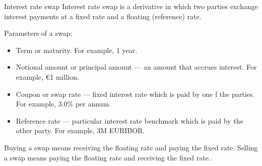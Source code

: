\documentclass{beamer}
\renewcommand{\EUR}[1]{\textup{\euro}#1}
\begin{document}
\begin{frame}{Interest rate swap}
\justify
\alert{Interest rate swap} is a derivative in which two parties exchange interest payments at a fixed rate and a floating (reference) rate.

\justify
Parameters of a swap:
\begin{itemize}
\justifying
\item Term or maturity. For example, 1 year.
\item Notional amount or principal amount --- an amount that accrues interest. For example, \EUR{1} million.
\item Coupon or swap rate --- fixed interest rate which is paid by one f the parties. For example, $3.0\%$ per annum.
\item Reference rate --- particular interest rate benchmark which is paid by the other party. For example, 3M EURIBOR.
\end{itemize}

\justify
Buying a swap means receiving the floating rate and paying the fixed rate. Selling a swap means paying the floating rate and receiving the fixed rate..
\end{frame}
\end{document}
